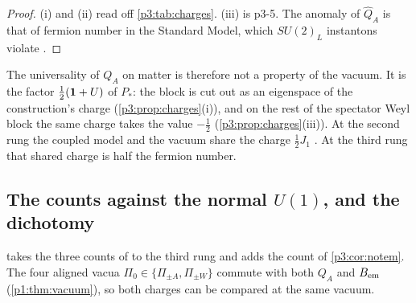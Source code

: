 \begin{proof}
(i) and (ii) read off \cref{p3:tab:charges}. (iii) is p3-5. The anomaly of $\hat Q_A$ is that of fermion number in the Standard Model, which $SU(2)_L$ instantons
violate \cite{tHooft76}.
\end{proof}

The universality of $Q_A$ on matter is therefore not a property of the vacuum. It is the factor $\tfrac12(\mathbf 1+U)$ of $P_*$: the block is cut out as an eigenspace of
the construction's charge (\cref{p3:prop:charges}(i)), and on the rest of the spectator Weyl block the same charge takes the value $-\tfrac12$
(\cref{p3:prop:charges}(iii)). At the second rung the coupled model and the vacuum share the charge $\tfrac12J_1$ \cite[Section~26]{ES17}. At the third rung that
shared charge is half the fermion number.

\subsection{The counts against the normal \texorpdfstring{$U(1)$}{U(1)}, and the dichotomy}
\label{p3:sec:counts}

 takes the three counts of \cite[Section~31]{ES17} to the third rung and adds the count of \cref{p3:cor:notem}. The four aligned vacua
$\Pi_0\in\{\Pi_{\pm A},\Pi_{\pm W}\}$ commute with both $Q_A$ and $B_{\rm em}$ (\cref{p1:thm:vacuum}), so both charges can be compared at the same vacuum.

